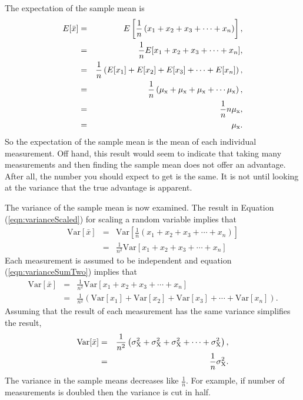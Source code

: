 \documentclass[12pt]{article}
\newcommand{\lp}{\left(}
\newcommand{\rp}{\right)}
\begin{document}
The expectation of the sample mean is
\begin{eqnarray}
  E[\bar{x}] & = & E\left[\frac{1}{n} \lp x_1+x_2+x_3+\cdots +x_n \rp\right],
  \nonumber \\
   & = & \frac{1}{n} E[x_1+x_2+x_3+\cdots +x_n], \nonumber \\
   & = & \frac{1}{n} \lp E[x_1]+E[x_2]+E[x_3]+\cdots+E[x_n]\rp,
   \nonumber \\
   & = & \frac{1}{n} \nonumber \lp
   \mu_{\rm{x}}+\mu_{\rm{x}}+\mu_{\rm{x}}+\cdots\mu_{\rm{x}}\rp,
   \nonumber \\
   & = & \frac{1}{n} n \mu_{\rm{x}}, \nonumber \\
   & = & \mu_{\rm{x}}. 
   \label{eqn:expectedSampleMean}
\end{eqnarray}
So the expectation of the sample mean is the mean of each individual
measurement. Off hand, this result would seem to indicate that taking
many measurements and then finding the sample mean does not offer an
advantage. After all, the number you should expect to get is the same.
It is not until looking at the variance that the true advantage is
apparent.

The variance of the sample mean is now examined. The result in
Equation (\ref{eqn:varianceScaled}) for scaling a random variable
implies that
\begin{eqnarray*}
  \mathrm{Var}[\bar{x}] & = & 
  \mathrm{Var}\left[\frac{1}{n} \lp x_1+x_2+x_3+\cdots +x_n \rp\right] \\
  & = & \frac{1}{n^2} \mathrm{Var}[x_1+x_2+x_3+\cdots +x_n]
\end{eqnarray*}
Each measurement is assumed to be independent and equation
(\ref{eqn:varianceSumTwo}) implies that
\begin{eqnarray*}
  \mathrm{Var}[\bar{x}] & = & 
  \frac{1}{n^2} \mathrm{Var}\left[ x_1+x_2+x_3+\cdots +x_n \right] \\
  & = & \frac{1}{n^2} 
  \lp \mathrm{Var}[x_1]+\mathrm{Var}[x_2]+\mathrm{Var}[x_3]+\cdots
  +\mathrm{Var}[x_n] \rp.
\end{eqnarray*}
Assuming that the result of each measurement has the same variance
simplifies the result,
\begin{eqnarray}
  \mathrm{Var}[\bar{x}] & = & \frac{1}{n^2} 
  \lp \sigma^2_{\rm X}+\sigma^2_{\rm X}+\sigma^2_{\rm X}+\cdots
  +\sigma^2_{\rm X} \rp, \nonumber \\
  \label{eqn:varSampleMean}
  & = & \frac{1}{n} \sigma^2_{\rm X}.
\end{eqnarray}
The variance in the sample means decreases like $\frac{1}{n}$. For
example, if number of measurements is doubled then the variance is cut
in half.
\end{document}
